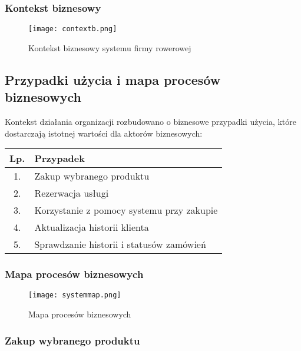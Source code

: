 \documentclass[a4paper,20pt]{article}
\begin{document}
\subsubsection{Kontekst biznesowy}

\begin{figure}[H]
\centerline{\texttt{[image: contextb.png]}}
\caption{Kontekst biznesowy systemu firmy rowerowej}
\label{contextb}
\end{figure}


\subsection{Przypadki użycia i mapa procesów biznesowych}

Kontekst działania organizacji rozbudowano o biznesowe przypadki użycia, które dostarczają istotnej wartości dla aktorów biznesowych:

\begin{table}[h!]
\centering
 \begin{tabular}{|| c || p{8cm}||} 
 \hline
 Lp. & Przypadek \\ [0.5ex] 
 \hline\hline
 1. & Zakup wybranego produktu \\ \hline
 2. & Rezerwacja usługi \\ \hline
 3. & Korzystanie z pomocy systemu przy zakupie \\ \hline
 4. & Aktualizacja historii klienta \\ \hline
 5. & Sprawdzanie historii i statusów zamówień   
   \\ [1ex] 
 \hline
 \end{tabular}
\end{table}

\newpage
\subsubsection{Mapa procesów biznesowych}

\begin{figure}[H]
\centerline{\texttt{[image: systemmap.png]}}
\caption{Mapa procesów biznesowych}
\label{systemmap}
\end{figure}




\newpage
\subsubsection{Zakup wybranego produktu}
\end{document}

